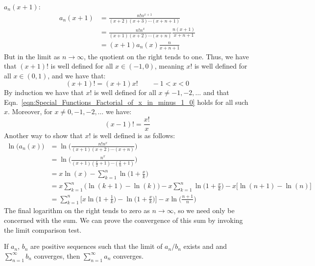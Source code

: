         $a_{n}(x+1)$:
        \begin{align}
            a_{n}(x+1)
            &=\frac{n!n^{x+1}}{(x+2)(x+3)\cdots(x+n+1)}\\
            &=\frac{n!n^{x}}{(x+1)(x+2)\cdots(x+n)}
                \frac{n(x+1)}{x+n+1}\\
            &=(x+1)a_{n}(x)\frac{n}{x+n+1}
        \end{align}
        But in the limit as $n\rightarrow\infty$, the quotient on the right
        tends to one. Thus, we have that $(x+1)!$ is well defined for all
        $x\in(-1,0)$, meaning $x!$ is well defined for all
        $x\in(0,1)$, and we have that:
        \begin{equation}
            \label{eqn:Special_Functions_Factorial_of_x_in_minus_1_0}
            (x+1)!=(x+1)x!
            \quad\quad
            \minus{1}<x<0
        \end{equation}
        By induction we have that $x!$ is well defined for all
        $x\ne\minus{1},\minus{2},\dots$ and that
        Eqn.~\ref{eqn:Special_Functions_Factorial_of_x_in_minus_1_0}
        holds for all such $x$. Moreover, for
        $x\ne0,\minus{1},\minus{2},\dots$ we have:
        \begin{equation}
            (x-1)!=\frac{x!}{x}
        \end{equation}
        Another way to show that $x!$ is well defined is as follows:
        \begin{align}
            \ln\big(a_{n}(x)\big)
            &=\ln\Big(\frac{n!n^{x}}{(x+1)(x+2)\cdots(x+n)}\Big)\\
            &=\ln\Big(
                \frac{n^{x}}{(x+1)(\frac{x}{2}+1)\cdots(\frac{x}{n}+1)}
            \Big)\\
            &=x\ln(x)-\sum_{k=1}^{n}\ln\Big(1+\frac{x}{k}\Big)\\
            &=x\sum_{k=1}^{n}\Big(\ln(k+1)-\ln(k)\Big)
                -x\sum_{k=1}^{n}\ln\Big(1+\frac{x}{k}\Big)
                -x\Big[\ln(n+1)-\ln(n)\Big]\\
            &=\sum_{k=1}^{n}\Big[
                x\ln\Big(1+\frac{1}{k}\Big)-
                \ln\Big(1+\frac{x}{k}\Big)\Big]-x\ln\Big(\frac{n+1}{n}\Big)
        \end{align}
        The final logarithm on the right tends to zero as
        $n\rightarrow\infty$, so we need only be concerned with the sum.
        We can prove the convergence of this sum by invoking the limit
        comparison test.
        \begin{theorem}
            If $a_{n}$, $b_{n}$ are positive sequences such that
            the limit of $a_{n}/b_{n}$ exists and and
            $\sum_{n=1}^{\infty}b_{n}$ converges, then
            $\sum_{n=1}^{\infty}a_{n}$ converges.
        \end{theorem}
